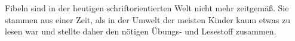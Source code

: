 Fibeln sind in der heutigen schriftorientierten Welt nicht mehr zeitgemäß.
Sie stammen aus einer Zeit, als in der Umwelt der meisten Kinder kaum etwas zu lesen war und stellte daher den nötigen Übungs- und Lesestoff zusammen.